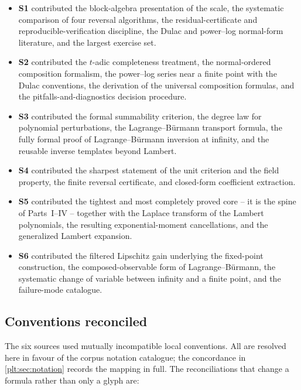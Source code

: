 \documentclass[11pt,oneside]{article}
\theoremstyle{plain}
\theoremstyle{definition}
\theoremstyle{remark}
\begin{document}
\begin{itemize}
\item \textbf{S1} contributed the block-algebra presentation of the scale, the
  systematic comparison of four reversal algorithms, the residual-certificate
  and reproducible-verification discipline, the Dulac and power--log normal-form
  literature, and the largest exercise set.
\item \textbf{S2} contributed the \(t\)-adic completeness treatment, the
  normal-ordered composition formalism, the power--log series near a finite
  point with the Dulac conventions, the derivation of the universal composition
  formulas, and the pitfalls-and-diagnostics decision procedure.
\item \textbf{S3} contributed the formal summability criterion, the degree law
  for polynomial perturbations, the Lagrange--B\"urmann transport formula, the
  fully formal proof of Lagrange--B\"urmann inversion at infinity, and the
  reusable inverse templates beyond Lambert.
\item \textbf{S4} contributed the sharpest statement of the unit criterion and
  the field property, the finite reversal certificate, and closed-form
  coefficient extraction.
\item \textbf{S5} contributed the tightest and most completely proved core --
  it is the spine of Parts~I--IV -- together with the Laplace transform of the
  Lambert polynomials, the resulting exponential-moment cancellations, and the
  generalized Lambert expansion.
\item \textbf{S6} contributed the filtered Lipschitz gain underlying the
  fixed-point construction, the composed-observable form of
  Lagrange--B\"urmann, the systematic change of variable between infinity and a
  finite point, and the failure-mode catalogue.
\end{itemize}

\subsection{Conventions reconciled}

The six sources used mutually incompatible local conventions.  All are resolved
here in favour of the corpus notation catalogue; the concordance in
\cref{plt:sec:notation} records the mapping in full.  The reconciliations that
change a formula rather than only a glyph are:
\end{document}
